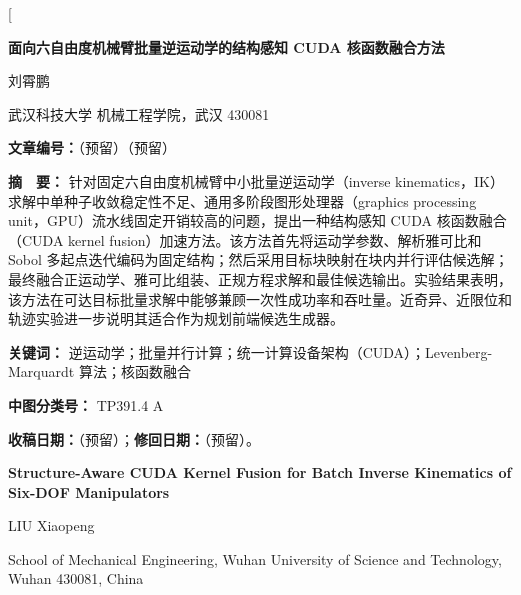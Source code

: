\documentclass[twocolumn,a4paper,10pt]{ctexart}
\begin{document}
\twocolumn[%
{\centering
{\LARGE\bfseries 面向六自由度机械臂批量逆运动学的结构感知 CUDA 核函数融合方法}\par\vspace{4mm}
{\large 刘霄鹏}\par\vspace{1mm}
{\small 武汉科技大学 机械工程学院，武汉 430081}\par\vspace{3mm}
{\small\bfseries 文章编号：}（预留）（预留）\par\vspace{2mm}
\begin{minipage}{0.91\textwidth}\small
{\bfseries 摘　要：} 针对固定六自由度机械臂中小批量逆运动学（inverse kinematics，IK）求解中单种子收敛稳定性不足、通用多阶段图形处理器（graphics processing unit，GPU）流水线固定开销较高的问题，提出一种结构感知 CUDA 核函数融合（CUDA kernel fusion）加速方法。该方法首先将运动学参数、解析雅可比和 Sobol 多起点迭代编码为固定结构；然后采用目标块映射在块内并行评估候选解；最终融合正运动学、雅可比组装、正规方程求解和最佳候选输出。实验结果表明，该方法在可达目标批量求解中能够兼顾一次性成功率和吞吐量。近奇异、近限位和轨迹实验进一步说明其适合作为规划前端候选生成器。\par\vspace{2mm}
{\bfseries 关键词：} 逆运动学；批量并行计算；统一计算设备架构（CUDA）；Levenberg-Marquardt 算法；核函数融合\par
{\bfseries 中图分类号：} TP391.4 A\par
{\bfseries 收稿日期：}（预留）；{\bfseries 修回日期：}（预留）。\par
\end{minipage}\par\vspace{4mm}
\begin{minipage}{0.91\textwidth}\small
{\centering
{\bfseries\large Structure-Aware CUDA Kernel Fusion for Batch Inverse Kinematics of Six-DOF Manipulators}\par\vspace{2mm}
{\small LIU Xiaopeng}\par\vspace{1mm}
{\small School of Mechanical Engineering, Wuhan University of Science and Technology, Wuhan 430081, China}\par\vspace{3mm}
}

\end{minipage}}
\end{document}
